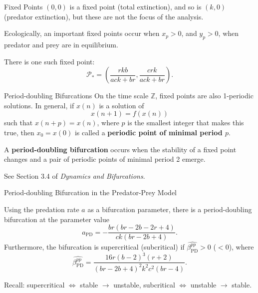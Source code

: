 \documentclass[]{beamer}
\begin{document}
	\begin{frame}{Fixed Points}
		$(0,0)$ is a fixed point (total extinction), and so is $(k,0)$ (predator extinction), but these are not the focus of the analysis.
		\vfill
		
		Ecologically, an important fixed points occur when $x_p > 0$, and $y_p > 0$, when predator and prey are in equilibrium.
		\vfill
		
		There is one such fixed point:
		\begin{equation*}
			\mathcal{P}_* = \left(\frac{rkb}{ack+br}, \frac{crk}{ack+br}\right).
		\end{equation*} 
	\end{frame}
	
	\begin{frame}{Period-doubling Bifurcations}
		On the time scale $\mathbb{Z}$, fixed points are also 1-periodic solutions. In general, if $x(n)$ is a solution of
		\begin{equation*}
			x(n+1) = f(x(n))
		\end{equation*}
		such that $x(n+p) = x(n)$, where $p$ is the smallest integer that makes this true, then $x_0 = x(0)$ is called a \textbf{periodic point of minimal period $p$}.
		\vfill
		
		A \textbf{period-doubling bifurcation} occurs when the stability of a fixed point changes and a pair of periodic points of minimal period 2 emerge.
		\vfill
		
		See Section 3.4 of \textit{Dynamics and Bifurcations}.
	\end{frame}
	
	\begin{frame}{Period-doubling Bifurcation in the Predator-Prey Model}
		\begin{block}{}
			Using the predation rate $a$ as a bifurcation parameter, there is a period-doubling bifurcation at the parameter value
			\begin{equation*}
				a_{\text{PD}} = -\frac{br(br-2b-2r+4)}{ck(br-2b+4)}.
			\end{equation*}
			Furthermore, the bifurcation is supercritical (subcritical) if $\widehat{\beta^{pp}_{\text{PD}}} > 0$ ($<0$), where
			\begin{equation*}
				\widehat{\beta^{pp}_{\text{PD}}} = \frac{16r(b-2)^3(r+2)}{(br-2b+4)^2k^2c^2(br-4)}.
			\end{equation*}
		\end{block}
		\vfill
		
		Recall: supercritical $\iff$ stable $\to$ unstable, subcritical $\iff$ unstable $\to$ stable.
	\end{frame}
	
\end{document}
